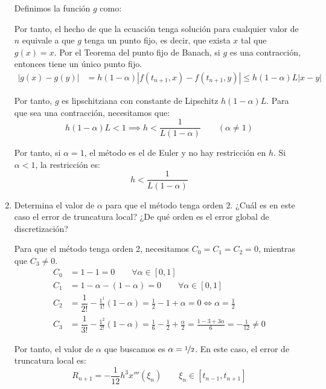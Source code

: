 \begin{ejercicio}
\begin{enumerate}
        Definimos la función $g$ como:

        Por tanto, el hecho de que la ecuación tenga solución para cualquier valor de $n$ equivale a que $g$ tenga un punto fijo, es decir, que exista $x$ tal que $g(x) = x$. Por el Teorema del punto fijo de Banach, si $g$ es una contracción, entonces tiene un único punto fijo.
        \begin{align*}
            |g(x) - g(y)| &= h(1-\alpha) |f(t_{n+1}, x) - f(t_{n+1}, y)|\leq h(1-\alpha)L |x - y|
        \end{align*}

        Por tanto, $g$ es lipschitziana con constante de Lipschitz $h(1-\alpha)L$. Para que sea una contracción, necesitamos que:
        \begin{equation*}
            h(1-\alpha)L < 1 \implies h < \frac{1}{L(1-\alpha)}\qquad (\alpha\neq 1)
        \end{equation*}

        Por tanto, si $\alpha = 1$, el método es el de Euler y no hay restricción en $h$. Si $\alpha < 1$, la restricción es:
        \begin{equation*}
            h < \frac{1}{L(1-\alpha)}
        \end{equation*}
        \item\label{ap:alpha}
        Determina el valor de $\alpha$ para que el método tenga orden 2. ¿Cuál es en este caso el error de truncatura local? ¿De qué orden es el error global de discretización?

        Para que el método tenga orden 2, necesitamos $C_0=C_1=C_2=0$, mientras que $C_3\neq 0$.
        \begin{align*}
            C_0 &= 1 - 1 = 0\qquad \forall \alpha\in [0, 1] \\
            C_1 &= 1 - \alpha - (1 - \alpha) = 0\qquad \forall \alpha\in [0, 1] \\
            C_2 &= \dfrac{1}{2!} - \frac{1^1}{1!}(1-\alpha) = \frac{1}{2} - 1+ \alpha = 0\iff \alpha = \frac{1}{2} \\
            C_3 &= \dfrac{1}{3!} - \frac{1^2}{2!}(1-\alpha) = \frac{1}{6} - \frac{1}{2} + \frac{\alpha}{2} = \frac{1-3 + 3\alpha}{6} = -\frac{1}{12}\neq 0
        \end{align*}

        Por tanto, el valor de $\alpha$ que buscamos es $\alpha = \nicefrac{1}{2}$. En este caso, el error de truncatura local es:
        \begin{equation*}
            R_{n+1} = -\frac{1}{12}h^3x'''(\xi_n)\qquad \xi_n \in [t_{n-1},t_{n+1}]
        \end{equation*}


\end{enumerate}
\end{ejercicio}
